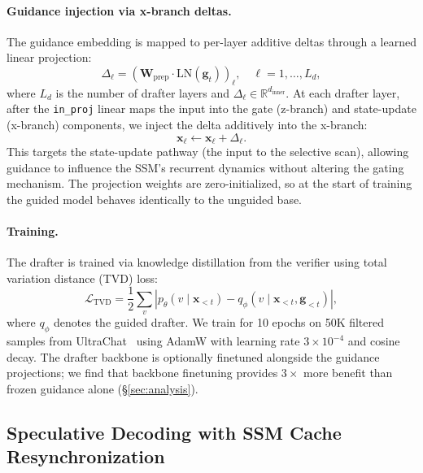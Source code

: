 \paragraph{Guidance injection via x-branch deltas.}
The guidance embedding is mapped to per-layer additive deltas through a learned linear projection:
\begin{equation}
  \Delta_\ell = (\mathbf{W}_{\mathrm{prep}} \cdot \mathrm{LN}(\mathbf{g}_t))_\ell, \quad \ell = 1, \ldots, L_d,
  \label{eq:prep_deltas}
\end{equation}
where $L_d$ is the number of drafter layers and $\Delta_\ell \in \mathbb{R}^{d_{\mathrm{inner}}}$.
At each drafter layer, after the \texttt{in\_proj} linear maps the input into the gate (z-branch) and state-update (x-branch) components, we inject the delta additively into the x-branch:
\begin{equation}
  \mathbf{x}_\ell \leftarrow \mathbf{x}_\ell + \Delta_\ell.
  \label{eq:inject}
\end{equation}
This targets the state-update pathway (the input to the selective scan), allowing guidance to influence the SSM's recurrent dynamics without altering the gating mechanism.
The projection weights are zero-initialized, so at the start of training the guided model behaves identically to the unguided base.

\paragraph{Training.}
The drafter is trained via knowledge distillation from the verifier using total variation distance (TVD) loss:
\begin{equation}
  \mathcal{L}_{\mathrm{TVD}} = \frac{1}{2} \sum_v |p_\theta(v \mid \mathbf{x}_{<t}) - q_\phi(v \mid \mathbf{x}_{<t}, \mathbf{g}_{<t})|,
  \label{eq:tvd}
\end{equation}
where $q_\phi$ denotes the guided drafter.
We train for 10 epochs on 50K filtered samples from UltraChat~\citep{ding2023ultrachat} using AdamW with learning rate $3{\times}10^{-4}$ and cosine decay.
The drafter backbone is optionally finetuned alongside the guidance projections; we find that backbone finetuning provides $3{\times}$ more benefit than frozen guidance alone (\S\ref{sec:analysis}).

\subsection{Speculative Decoding with SSM Cache Resynchronization}
\label{sec:replay}

